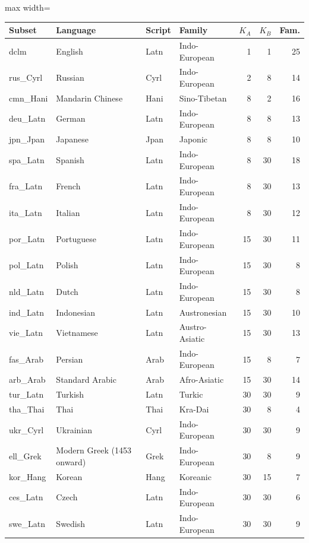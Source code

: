 \begin{table}[p]
\centering
\tiny
\setlength{\tabcolsep}{2.5pt}
\begin{minipage}[t]{0.49\textwidth}\centering
\begin{adjustbox}{max width=\linewidth}
\begin{tabular}[t]{llllrrr}
\toprule
Subset & Language & Script & Family & $K_A$ & $K_B$ & Fam. \\
\midrule
dclm & English & Latn & Indo-European & 1 & 1 & 25 \\
rus\_Cyrl & Russian & Cyrl & Indo-European & 2 & 8 & 14 \\
cmn\_Hani & Mandarin Chinese & Hani & Sino-Tibetan & 8 & 2 & 16 \\
deu\_Latn & German & Latn & Indo-European & 8 & 8 & 13 \\
jpn\_Jpan & Japanese & Jpan & Japonic & 8 & 8 & 10 \\
spa\_Latn & Spanish & Latn & Indo-European & 8 & 30 & 18 \\
fra\_Latn & French & Latn & Indo-European & 8 & 30 & 13 \\
ita\_Latn & Italian & Latn & Indo-European & 8 & 30 & 12 \\
por\_Latn & Portuguese & Latn & Indo-European & 15 & 30 & 11 \\
pol\_Latn & Polish & Latn & Indo-European & 15 & 30 & 8 \\
nld\_Latn & Dutch & Latn & Indo-European & 15 & 30 & 8 \\
ind\_Latn & Indonesian & Latn & Austronesian & 15 & 30 & 10 \\
vie\_Latn & Vietnamese & Latn & Austro-Asiatic & 15 & 30 & 13 \\
fas\_Arab & Persian & Arab & Indo-European & 15 & 8 & 7 \\
arb\_Arab & Standard Arabic & Arab & Afro-Asiatic & 15 & 30 & 14 \\
tur\_Latn & Turkish & Latn & Turkic & 30 & 30 & 9 \\
tha\_Thai & Thai & Thai & Kra-Dai & 30 & 8 & 4 \\
ukr\_Cyrl & Ukrainian & Cyrl & Indo-European & 30 & 30 & 9 \\
ell\_Grek & Modern Greek (1453 onward) & Grek & Indo-European & 30 & 8 & 9 \\
kor\_Hang & Korean & Hang & Koreanic & 30 & 15 & 7 \\
ces\_Latn & Czech & Latn & Indo-European & 30 & 30 & 6 \\
swe\_Latn & Swedish & Latn & Indo-European & 30 & 30 & 9 \\

\end{tabular}
\end{adjustbox}
\end{minipage}
\end{table}
